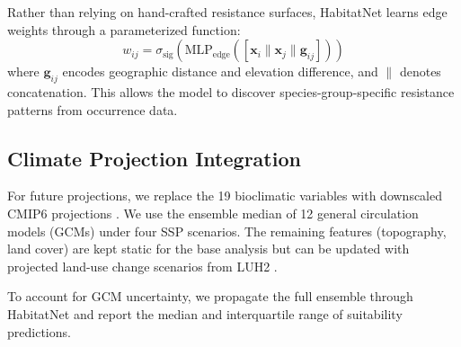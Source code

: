 Rather than relying on hand-crafted resistance surfaces, HabitatNet
learns edge weights through a parameterized function:
\begin{equation}
  w_{ij} = \sigma_{\text{sig}}\!\left(
    \text{MLP}_{\text{edge}}([\mathbf{x}_i \| \mathbf{x}_j \|
    \mathbf{g}_{ij}])
  \right)
\end{equation}
where $\mathbf{g}_{ij}$ encodes geographic distance and elevation
difference, and $\|$ denotes concatenation. This allows the model to
discover species-group-specific resistance patterns from occurrence data.

\subsection{Climate Projection Integration}

For future projections, we replace the 19 bioclimatic variables with
downscaled CMIP6 projections \citep{eyring2016overview}. We use the
ensemble median of 12 general circulation models (GCMs) under four SSP
scenarios. The remaining features (topography, land cover) are kept
static for the base analysis but can be updated with projected land-use
change scenarios from LUH2 \citep{hurtt2020harmonization}.

To account for GCM uncertainty, we propagate the full ensemble through
HabitatNet and report the median and interquartile range of suitability
predictions.


